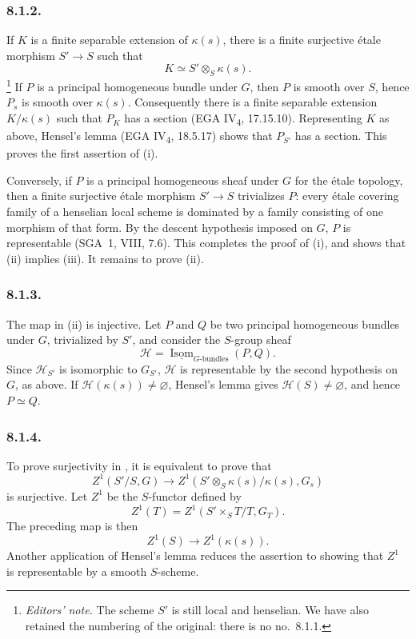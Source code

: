 \subsubsection*{8.1.2.}

If \(K\) is a finite separable extension of \(\kappa(s)\), there is a
finite surjective étale morphism \(S'\to S\) such that
\[
  K\simeq S'\otimes_S\kappa(s).
\]
\footnote{\textit{Editors' note.} The scheme \(S'\) is still local and
henselian. We have also retained the numbering of the original: there
is no no.~8.1.1.}
If \(P\) is a principal homogeneous bundle under \(G\), then \(P\) is
smooth over \(S\), hence \(P_s\) is smooth over \(\kappa(s)\).
Consequently there is a finite separable extension \(K/\kappa(s)\)
such that \(P_K\) has a section (EGA IV\textsubscript{4}, 17.15.10).
Representing \(K\) as above, Hensel's lemma
(EGA IV\textsubscript{4}, 18.5.17) shows that \(P_{S'}\) has a section.
This proves the first assertion of (i).

Conversely, if \(P\) is a principal homogeneous sheaf under \(G\) for
the étale topology, then a finite surjective étale morphism
\(S'\to S\) trivializes \(P\): every étale covering family of a
henselian local scheme is dominated by a family consisting of one
morphism of that form. By the descent hypothesis imposed on \(G\),
\(P\) is representable (SGA~1, VIII, 7.6). This completes the proof of
(i), and shows that (ii) implies (iii). It remains to prove (ii).

\subsubsection*{8.1.3.}

The map in (ii) is injective. Let \(P\) and \(Q\) be two principal
homogeneous bundles under \(G\), trivialized by \(S'\), and consider
the \(S\)-group sheaf
\[
  \mathcal H=
  \underline{\operatorname{Isom}}_{G\text{-}\mathrm{bundles}}(P,Q).
\]
Since \(\mathcal H_{S'}\) is isomorphic to \(G_{S'}\),
\(\mathcal H\) is representable by the second hypothesis on \(G\), as
above. If \(\mathcal H(\kappa(s))\neq\varnothing\), Hensel's lemma
gives \(\mathcal H(S)\neq\varnothing\), and hence \(P\simeq Q\).

\subsubsection*{8.1.4.}

To prove surjectivity in , it is equivalent to prove that
\[
  Z^1(S'/S,G)
  \longrightarrow
  Z^1(S'\otimes_S\kappa(s)/\kappa(s),G_s)
\]
is surjective. Let \(Z^1\) be the \(S\)-functor defined by
\[
  Z^1(T)=Z^1(S'\times_ST/T,G_T).
\]
The preceding map is then
\[
  Z^1(S)\longrightarrow Z^1(\kappa(s)).
\]
Another application of Hensel's lemma reduces the assertion to
showing that \(Z^1\) is representable by a smooth \(S\)-scheme.

